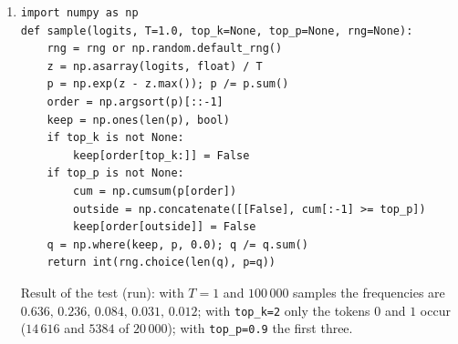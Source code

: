 \begin{enumerate}[label=\textbf{\ansnum.\arabic*}]
  \item[\textbf{\ansnum.10}]
\begin{verbatim}
import numpy as np
def sample(logits, T=1.0, top_k=None, top_p=None, rng=None):
    rng = rng or np.random.default_rng()
    z = np.asarray(logits, float) / T
    p = np.exp(z - z.max()); p /= p.sum()
    order = np.argsort(p)[::-1]
    keep = np.ones(len(p), bool)
    if top_k is not None:
        keep[order[top_k:]] = False
    if top_p is not None:
        cum = np.cumsum(p[order])
        outside = np.concatenate([[False], cum[:-1] >= top_p])
        keep[order[outside]] = False
    q = np.where(keep, p, 0.0); q /= q.sum()
    return int(rng.choice(len(q), p=q))
\end{verbatim}
  Result of the test (run): with $T=1$ and $100\,000$ samples the frequencies are $0.636,\,0.236,\,0.084,\,0.031,\,0.012$; with \texttt{top\_k=2} only the tokens $0$ and $1$ occur ($14\,616$ and $5384$ of $20\,000$); with \texttt{top\_p=0.9} the first three.
\end{enumerate}
